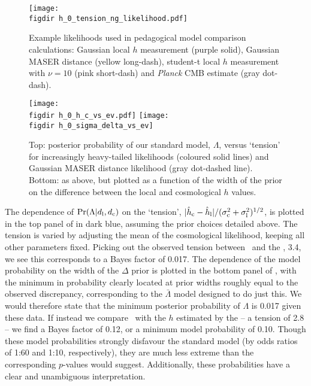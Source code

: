 \documentclass[a4paper,fleqn,usenatbib]{mnras}
\newcommand{\riess}{\citetalias{Riess_etal:2016}}
\newcommand{\msame}{\Lambda}
\newcommand{\mdiff}{\bar{\Lambda}}
\newcommand{\hlobs}{\hat{h}_{\rm l}}
\newcommand{\hcobs}{\hat{h}_{\rm c}}
\newcommand{\hlerr}{\sigma_{\rm l}}
\newcommand{\hcerr}{\sigma_{\rm c}}
\newcommand{\datl}{d_{\rm l}}
\newcommand{\datc}{d_{\rm c}}
\begin{document}
{\begin{figure}
\texttt{[image: \\figdir h\_0\_tension\_ng\_likelihood.pdf]}
\caption{Example likelihoods used in pedagogical model comparison calculations: Gaussian local $h$ measurement (purple solid), Gaussian MASER distance (yellow long-dash), student-t local $h$ measurement with $\nu=10$ (pink short-dash) and {\it Planck} CMB estimate (gray dot-dash).}
\label{figure:toy_model_likelihoods}
\end{figure}

\begin{figure}
\texttt{[image: \\figdir h\_0\_h\_c\_vs\_ev.pdf]}
\texttt{[image: \\figdir h\_0\_sigma\_delta\_vs\_ev]}
\caption{Top: posterior probability of our standard model, $\Lambda$, versus `tension' for increasingly heavy-tailed likelihoods (coloured solid lines) and Gaussian MASER distance likelihood (gray dot-dashed line). Bottom: as above, but plotted as a function of the width of the prior on the difference between the local and cosmological $h$ values.}
\label{figure:toy_model_evidences}
\end{figure}

The dependence of $\prob(\Lambda | \datl, \datc)$ on the `tension', $|\hcobs - \hlobs| / (\hcerr^2 + \hlerr^2)^{1/2}$, is plotted in the top panel of  in dark blue,
assuming the prior choices detailed above. The tension is varied by adjusting the mean of the cosmological likelihood, keeping all other parameters fixed. Picking out the observed tension between \riess\ and the \citet{Planck_Int_XLVI:2016}, 3.4, we see this corresponds to a Bayes factor of 0.017. The dependence of the model probability on the width of the $\Delta$ prior is plotted in the bottom panel of , with the minimum in probability clearly located at prior widths roughly equal to the observed discrepancy, corresponding to the $\mdiff$ model designed to do just this. We would therefore state that the minimum posterior probability of $\msame$ is 0.017 given these data. If instead we compare \riess\ with the $h$ estimated by the \citet{Planck_XIII:2016} -- a tension of 2.8 -- we find a Bayes factor of 0.12, or a minimum model probability of 0.10. Though these model probabilities strongly disfavour the standard model (by odds ratios of 1:60 and 1:10, respectively), they are much less extreme than the corresponding $p$-values would suggest.
Additionally, these probabilities have a clear and unambiguous interpretation.


}
\end{document}
